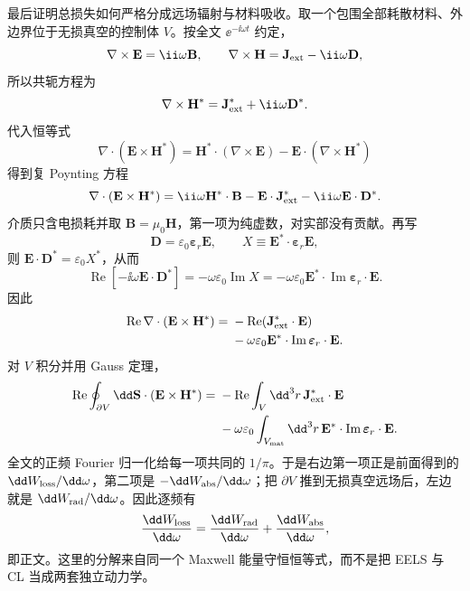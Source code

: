 \begin{derivation}
最后证明总损失如何严格分成远场辐射与材料吸收。取一个包围全部耗散材料、外边界位于无损真空的控制体 $V$。按全文 $\ee^{-\ii\omega t}$ 约定，
\begin{equation*}
 \nabla\times\mathbf E=\ii\omega\mathbf B,
 \qquad
 \nabla\times\mathbf H=\mathbf J_{\rm ext}-\ii\omega\mathbf D,
\end{equation*}
所以共轭方程为
\begin{equation*}
 \nabla\times\mathbf H^*=\mathbf J_{\rm ext}^*+\ii\omega\mathbf D^*.
\end{equation*}
代入恒等式
\begin{equation*}
 \nabla\cdot(\mathbf E\times\mathbf H^*)
 =\mathbf H^*\cdot(\nabla\times\mathbf E)
 -\mathbf E\cdot(\nabla\times\mathbf H^*)
\end{equation*}
得到复 Poynting 方程
\begin{equation*}
 \nabla\cdot(\mathbf E\times\mathbf H^*)
 =\ii\omega\mathbf H^*\cdot\mathbf B
 -\mathbf E\cdot\mathbf J_{\rm ext}^*
 -\ii\omega\mathbf E\cdot\mathbf D^*.
\end{equation*}
介质只含电损耗并取 $\mathbf B=\mu_0\mathbf H$，第一项为纯虚数，对实部没有贡献。再写
\begin{equation*}
 \mathbf D=\varepsilon_0\boldsymbol\varepsilon_r\mathbf E,
 \qquad
 X\equiv\mathbf E^*\cdot\boldsymbol\varepsilon_r\mathbf E,
\end{equation*}
则 $\mathbf E\cdot\mathbf D^*=\varepsilon_0X^*$，从而
\begin{equation*}
 \operatorname{Re}[-\ii\omega\mathbf E\cdot\mathbf D^*]
 =-\omega\varepsilon_0\operatorname{Im}X
 =-\omega\varepsilon_0
 \mathbf E^*\cdot\operatorname{Im}\boldsymbol\varepsilon_r\cdot\mathbf E.
\end{equation*}
因此
\begin{align*}
 \operatorname{Re}\nabla\cdot(\mathbf E\times\mathbf H^*)
 ={}&-\operatorname{Re}(\mathbf J_{\rm ext}^*\cdot\mathbf E)\\
 &-\omega\varepsilon_0
 \mathbf E^*\cdot\operatorname{Im}\boldsymbol\varepsilon_r\cdot\mathbf E.
\end{align*}
对 $V$ 积分并用 Gauss 定理，
\begin{align*}
 \operatorname{Re}\oint_{\partial V}\dd\mathbf S\cdot
 (\mathbf E\times\mathbf H^*)
 ={}&-\operatorname{Re}\int_V\dd^3r\,
 \mathbf J_{\rm ext}^*\cdot\mathbf E\\
 &-\omega\varepsilon_0\int_{V_{\rm mat}}\dd^3r\,
 \mathbf E^*\cdot\operatorname{Im}\boldsymbol\varepsilon_r\cdot\mathbf E.
\end{align*}
全文的正频 Fourier 归一化给每一项共同的 $1/\pi$。于是右边第一项正是前面得到的 $\dd W_{\rm loss}/\dd\omega$，第二项是 $-\dd W_{\rm abs}/\dd\omega$；把 $\partial V$ 推到无损真空远场后，左边就是 $\dd W_{\rm rad}/\dd\omega$。因此逐频有
\begin{equation*}
 \frac{\dd W_{\rm loss}}{\dd\omega}
 =\frac{\dd W_{\rm rad}}{\dd\omega}
 +\frac{\dd W_{\rm abs}}{\dd\omega},
\end{equation*}
即正文。这里的分解来自同一个 Maxwell 能量守恒恒等式，而不是把 EELS 与 CL 当成两套独立动力学。
\end{derivation}

